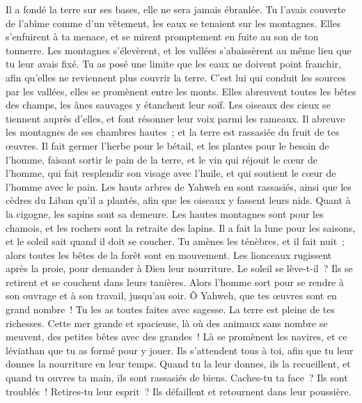 \begin{multicols}{2}
Il a fondé la terre sur ses bases, elle ne sera jamais ébranlée.
Tu l'avais couverte de l'abîme comme d'un vêtement, les eaux se tenaient sur les montagnes.
Elles s'enfuirent à ta menace, et se mirent promptement en fuite au son de ton tonnerre.
Les montagnes s'élevèrent, et les vallées s'abaissèrent au même lieu que tu leur avais fixé.
Tu as posé une limite que les eaux ne doivent point franchir, afin qu'elles ne reviennent plus couvrir la terre.
C'est lui qui conduit les sources par les vallées, elles se promènent entre les monts.
Elles abreuvent toutes les bêtes des champs, les ânes sauvages y étanchent leur soif.
Les oiseaux des cieux se tiennent auprès d'elles, et font résonner leur voix parmi les rameaux.
Il abreuve les montagnes de ses chambres hautes~; et la terre est rassasiée du fruit de tes œuvres.
Il fait germer l'herbe pour le bétail, et les plantes pour le besoin de l'homme, faisant sortir le pain de la terre,
et le vin qui réjouit le cœur de l'homme, qui fait resplendir son visage avec l'huile, et qui soutient le cœur de l'homme avec le pain.
Les hauts arbres de Yahweh en sont rassasiés, ainsi que les cèdres du Liban qu'il a plantés,
afin que les oiseaux y fassent leurs nids. Quant à la cigogne, les sapins sont sa demeure.
Les hautes montagnes sont pour les chamois, et les rochers sont la retraite des lapins.
Il a fait la lune pour les saisons, et le soleil sait quand il doit se coucher.
Tu amènes les ténèbres, et il fait nuit~; alors toutes les bêtes de la forêt sont en mouvement.
Les lionceaux rugissent après la proie, pour demander à Dieu leur nourriture.
Le soleil se lève-t-il~? Ils se retirent et se couchent dans leurs tanières.
Alors l'homme sort pour se rendre à son ouvrage et à son travail, jusqu'au soir.
Ô Yahweh, que tes œuvres sont en grand nombre~! Tu les as toutes faites avec sagesse. La terre est pleine de tes richesses.
Cette mer grande et spacieuse, là où des animaux sans nombre se meuvent, des petites bêtes avec des grandes~!
Là se promènent les navires, et ce léviathan que tu as formé pour y jouer.
Ils s'attendent tous à toi, afin que tu leur donnes la nourriture en leur temps.
Quand tu la leur donnes, ils la recueillent, et quand tu ouvres ta main, ils sont rassasiés de biens.
Caches-tu ta face~? Ils sont troublés~! Retires-tu leur esprit~? Ils défaillent et retournent dans leur poussière.

\end{multicols}
